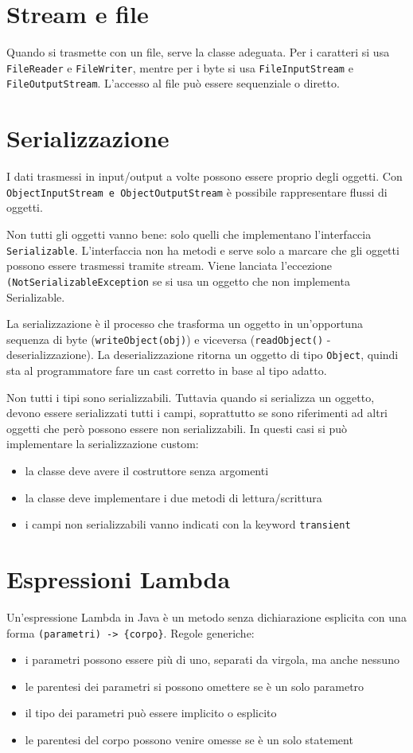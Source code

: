 \section{Stream e file}
Quando si trasmette con un file, serve la classe adeguata. Per i caratteri si usa \texttt{FileReader} e \texttt{FileWriter}, mentre per i byte si usa \texttt{FileInputStream} e \texttt{FileOutputStream}.
L'accesso al file può essere sequenziale o diretto.

\section{Serializzazione}
I dati trasmessi in input/output a volte possono essere proprio degli oggetti. Con \texttt{ObjectInputStream e ObjectOutputStream} è possibile rappresentare flussi di oggetti. 

Non tutti gli oggetti vanno bene: solo quelli che implementano l'interfaccia \texttt{Serializable}. L'interfaccia non ha metodi e serve solo a marcare che gli oggetti possono essere trasmessi tramite stream. Viene lanciata l'eccezione \texttt{(NotSerializableException} se si usa un oggetto che non implementa Serializable.

La serializzazione è il processo che trasforma un oggetto in un'opportuna sequenza di byte (\texttt{writeObject(obj)}) e viceversa (\texttt{readObject()} - deserializzazione). La deserializzazione ritorna un oggetto di tipo \texttt{Object}, quindi sta al programmatore fare un cast corretto in base al tipo adatto. 

Non tutti i tipi sono serializzabili. Tuttavia quando si serializza un oggetto, devono essere serializzati tutti i campi, soprattutto se sono riferimenti ad altri oggetti che però possono essere non serializzabili. In questi casi si può implementare la serializzazione custom:
\begin{itemize}
\item la classe deve avere il costruttore senza argomenti
\item la classe deve implementare i due metodi di lettura/scrittura
\item i campi non serializzabili vanno indicati con la keyword \texttt{transient}
\end{itemize}

\section{Espressioni Lambda}
Un'espressione Lambda in Java è un metodo senza dichiarazione esplicita con una forma \texttt{(parametri) -> \{corpo\}}.
Regole generiche:
\begin{itemize}
\item i parametri possono essere più di uno, separati da virgola, ma anche nessuno
\item le parentesi dei parametri si possono omettere se è un solo parametro
\item il tipo dei parametri può essere implicito o esplicito
\item le parentesi del corpo possono venire omesse se è un solo statement
\end{itemize}

